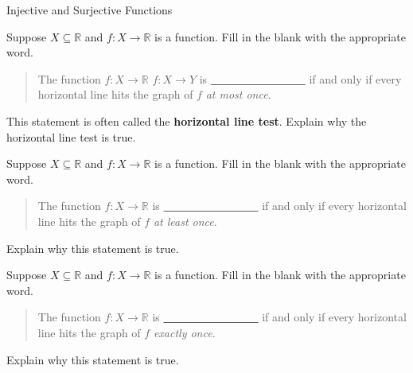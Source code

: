 \begin{section}{Injective and Surjective Functions}
\begin{problem}
Suppose $X\subseteq \mathbb{R}$ and $f:X\to \mathbb{R}$ is a function. Fill in the blank with the appropriate word.
\begin{quote}
The function $f:X\to \mathbb{R}$ $f:X\to Y$ is \underline{\ \ \ \ \ \ \ \  \ \ \ \ \ \ \ \ \ } if and only if every horizontal line hits the graph of $f$ \emph{at most once}.
\end{quote}
This statement is often called the \textbf{horizontal line test}.  Explain why the horizontal line test is true.
\end{problem}

\begin{problem}
Suppose $X\subseteq \mathbb{R}$ and $f:X\to \mathbb{R}$ is a function. Fill in the blank with the appropriate word.
\begin{quote}
The function $f:X\to \mathbb{R}$ is \underline{\ \ \ \ \ \ \ \  \ \ \ \ \ \ \ \ \ } if and only if every horizontal line hits the graph of $f$ \emph{at least once}.
\end{quote}
Explain why this statement is true.
\end{problem}

\begin{problem}
Suppose $X\subseteq \mathbb{R}$ and $f:X\to \mathbb{R}$ is a function. Fill in the blank with the appropriate word.
\begin{quote}
The function $f:X\to \mathbb{R}$ is \underline{\ \ \ \ \ \ \ \  \ \ \ \ \ \ \ \ \ } if and only if every horizontal line hits the graph of $f$ \emph{exactly once}.
\end{quote}
Explain why this statement is true.
\end{problem}


\end{section}
